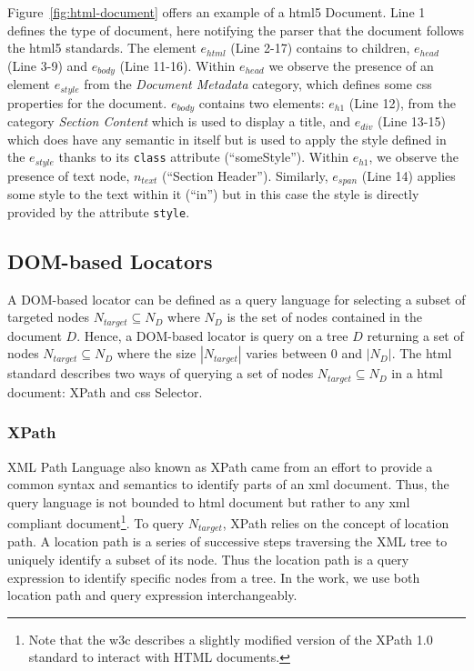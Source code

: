 Figure~\ref{fig:html-document} offers an example of a \gls{html}5 Document. Line 1 defines the type of document, here notifying the parser that the document follows the \gls{html}5 standards. The element $e_{html}$ (Line 2-17) contains to children, $e_{head}$ (Line 3-9) and $e_{body}$ (Line 11-16). Within $e_{head}$ we observe the presence of an element $e_{style}$ from the \emph{Document Metadata} category, which defines some \gls{css} properties for the document. $e_{body}$ contains two elements: $e_{h1}$ (Line 12), from the category \emph{Section Content} which is used to display a title, and $e_{div}$ (Line 13-15) which does have any semantic in itself but is used to apply the style defined in the $e_{style}$ thanks to its \texttt{class} attribute (``someStyle''). Within $e_{h1}$, we observe the presence of text node, $n_{text}$ (``Section Header''). Similarly, $e_{span}$ (Line 14) applies some style to the text within it (``in'') but in this case the style is directly provided by the attribute \texttt{style}.

\subsection{DOM-based Locators}
\label{sec:hpath-introduction-locators}

A DOM-based locator can be defined as a query language for selecting a subset of targeted nodes $N_{target} \subseteq N_D$ where $N_D$ is the set of nodes contained in the document $D$. Hence, a DOM-based locator is query on a tree $D$ returning a set of nodes $N_{target} \subseteq N_D$ where the size $|N_{target}|$ varies between 0 and $|N_D|$. The \gls{html} standard describes two ways of querying a set of nodes $N_{target} \subseteq N_D$ in a \gls{html} document: XPath and \gls{css} Selector. 

\subsubsection{XPath}
\label{sec:hpath-introduction-xpath}

XML Path Language also known as XPath came from an effort to provide a common syntax and semantics to identify parts of an \gls{xml} document\cite{W3C2016}. Thus, the query language is not bounded to \gls{html} document but rather to any \gls{xml} compliant document\footnote{Note that the \gls{w3c} describes a slightly modified version of the XPath 1.0 standard to interact with HTML documents.}. To query $N_{target}$, XPath relies on the concept of location path. A location path\cite{Gottlob2002} is a series of successive steps traversing the XML tree to uniquely identify a subset of its node. Thus the location path is a query expression to identify specific nodes from a tree. In the work, we use both location path and query expression interchangeably.

